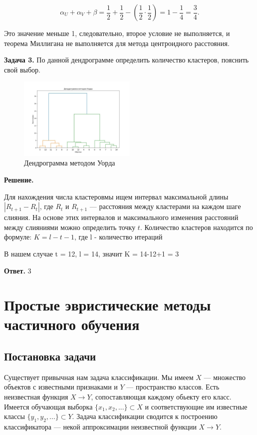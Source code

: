 \[
\alpha_U + \alpha_V + \beta = \frac{1}{2} + \frac{1}{2} - \left( \frac{1}{2} \cdot \frac{1}{2} \right)=1 - \frac{1}{4} = \frac{3}{4}.
\]

Это значение меньше 1, следовательно, второе условие не выполняется, и теорема Миллигана не выполняется для метода центроидного расстояния.

\textbf{Задача 3.}
По данной дендрограмме определить количество кластеров, пояснить свой выбор.

\begin{figure}[h!]
    \centering
    \includegraphics[width=0.5\textwidth]{png/figure2.jpg} %
    \caption{Дендрограмма методом Уорда}
\end{figure}

\textbf{Решение.}

Для нахождения числа кластеровмы ищем интервал максимальной длины \( |R_{t+1} - R_t| \), где \( R_t \) и \( R_{t+1} \) — расстояния между кластерами на каждом шаге слияния. На основе этих интервалов и максимального изменения расстояний между слияниями можно определить точку \( t \).
Количество кластеров находится по формуле: 
$K=l - t - 1$, где l - количество итераций

В нашем случае t = 12, l = 14, значит K = 14-12+1 = 3

\textbf{Ответ.} 3

\section{Простые эвристические методы частичного обучения}
\subsection{Постановка задачи}
Существует привычная нам задача классификации. Мы имеем $X$ --- множество объектов с известными признаками и $Y$ --- пространство классов. Есть неизвестная функция $X \longrightarrow Y$, сопоставляющая каждому обьекту его класс. Имеется обучающая выборка $\{x_1, x_2, ...\} \subset X$ и соответствующие им известные классы $\{y_1, y_2, ...\} \subset Y$. Задача классификации сводится к построению классификатора --- некой аппроксимации неизвестной функции $X \longrightarrow Y$. \\

